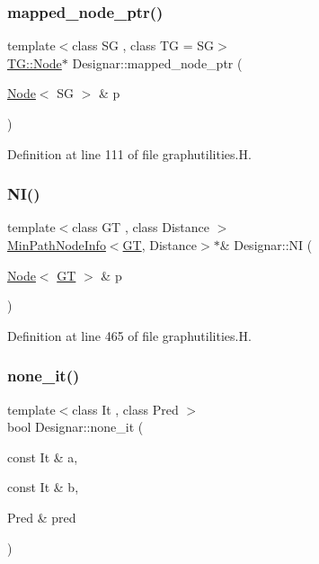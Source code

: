 \subsubsection{\texorpdfstring{mapped\+\_\+node\+\_\+ptr()}{mapped\_node\_ptr()}}
{\footnotesize\ttfamily template$<$class SG , class TG  = SG$>$ \\
\hyperlink{test-mtreenode_8_c_a17a24b0725f59987143c5faf63c4dc6f}{T\+G\+::\+Node}$\ast$ Designar\+::mapped\+\_\+node\+\_\+ptr (\begin{DoxyParamCaption}\item[{\hyperlink{namespace_designar_a5af326c65aa2bd26b26c410f2030d09e}{Node}$<$ SG $>$ \&}]{p }\end{DoxyParamCaption})}



Definition at line 111 of file graphutilities.\+H.

\mbox{\label{namespace_designar_aa80d7cfe1f0b0822f8e1bf21d4c9b5bf}} 
\subsubsection{\texorpdfstring{N\+I()}{NI()}}
{\footnotesize\ttfamily template$<$class GT , class Distance $>$ \\
\hyperlink{class_designar_1_1_min_path_node_info}{Min\+Path\+Node\+Info}$<$\hyperlink{demo-buildgraph_8_c_a3001c40d2c31ca87ed96cd7d1334a55e}{GT}, Distance$>$$\ast$\& Designar\+::\+NI (\begin{DoxyParamCaption}\item[{\hyperlink{namespace_designar_a5af326c65aa2bd26b26c410f2030d09e}{Node}$<$ \hyperlink{demo-buildgraph_8_c_a3001c40d2c31ca87ed96cd7d1334a55e}{GT} $>$ \&}]{p }\end{DoxyParamCaption})\hspace{0.3cm}{\ttfamily [inline]}}



Definition at line 465 of file graphutilities.\+H.

\mbox{\label{namespace_designar_a1f6b851accb92e3589c88a4c75061588}} 
\subsubsection{\texorpdfstring{none\+\_\+it()}{none\_it()}\hspace{0.1cm}{\footnotesize\ttfamily [1/2]}}
{\footnotesize\ttfamily template$<$class It , class Pred $>$ \\
bool Designar\+::none\+\_\+it (\begin{DoxyParamCaption}\item[{const It \&}]{a,  }\item[{const It \&}]{b,  }\item[{Pred \&}]{pred }\end{DoxyParamCaption})}



